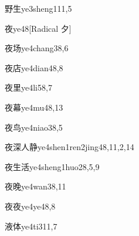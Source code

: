 \begin{verbete}{野生}{ye3sheng1}{11,5}
\end{verbete}

\begin{verbete}{夜}{ye4}{8}[Radical 夕]
\end{verbete}

\begin{verbete}{夜场}{ye4chang3}{8,6}
\end{verbete}

\begin{verbete}{夜店}{ye4dian4}{8,8}
\end{verbete}

\begin{verbete}{夜里}{ye4li5}{8,7}
\end{verbete}

\begin{verbete}{夜幕}{ye4mu4}{8,13}
\end{verbete}

\begin{verbete}{夜鸟}{ye4niao3}{8,5}
\end{verbete}

\begin{verbete}{夜深人静}{ye4shen1ren2jing4}{8,11,2,14}
\end{verbete}

\begin{verbete}{夜生活}{ye4sheng1huo2}{8,5,9}
\end{verbete}

\begin{verbete}{夜晚}{ye4wan3}{8,11}
\end{verbete}

\begin{verbete}{夜夜}{ye4ye4}{8,8}
\end{verbete}

\begin{verbete}{液体}{ye4ti3}{11,7}
\end{verbete}

